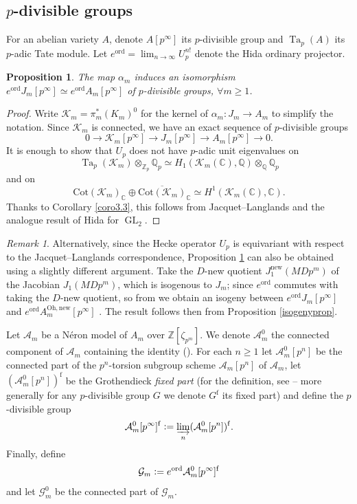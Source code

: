 \documentclass[a4paper,11pt]{amsart}
\numberwithin{equation}{section}
\theoremstyle{plain}
\newtheorem{proposition}[theorem]{Proposition}
\theoremstyle{definition}
\theoremstyle{remark}
\newtheorem{remark}[theorem]{Remark}
\newcommand{\Q}{\mathbb{Q}}
\newcommand{\Z}{\mathbb{Z}}
\newcommand{\C}{\mathbb{C}}
\newcommand{\defeq}{\vcentcolon=}
\DeclareMathOperator{\GL}{GL}
\DeclareMathOperator{\Ta}{Ta}
\newcommand{\ord}{\mathrm{ord}}
\newcommand{\new}{\mathrm{new}}
\newcommand{\Cot}{\mathrm{Cot}}
\newcommand{\Oh}{\mathrm{Oh}}
\newcommand{\dirlim}{\mathop{\varinjlim}\limits}
\begin{document}
\subsection{$p$-divisible groups}
For an abelian variety $A$, denote $A[p^\infty]$ its $p$-divisible group and $\Ta_p(A)$ its $p$-adic Tate module. {Let $e^\ord=\lim_{n\to\infty} U_p^{n!}$ denote the Hida ordinary projector.}

\begin{proposition}\label{isopdiv1}
The map $\alpha_m$ induces an isomorphism $e^\ord J_m[p^\infty]\simeq e^\ord A_m[p^\infty]$ of $p$-divisible groups, $\forall m\geq 1$.  
\end{proposition}

\begin{proof} Write $\mathcal{K}_m=\pi^*_m(K_m)^0$ for the kernel of $\alpha_m\colon J_m\rightarrow A_m$ to simplify the notation. Since $\mathcal{K}_m$ is connected, we have an exact sequence of $p$-divisible groups 
\[0\longrightarrow \mathcal{K}_m[p^\infty]\longrightarrow J_m[p^\infty]\longrightarrow A_m[p^\infty]\longrightarrow 0.\]
It is enough to show that $U_p$ does not have $p$-adic unit eigenvalues on \[\Ta_p(\mathcal{K}_m)\otimes_{\Z_p}\Q_p\simeq H_1(\mathcal{K}_m(\C),\Q)\otimes_\Q\Q_p\] and on \[\Cot(\mathcal{K}_m)_\C\oplus\overline{\Cot(\mathcal{K}_m)}_\C\simeq H^1(\mathcal{K}_m(\C),\C).\]
Thanks to Corollary \ref{coro3.3}, this follows from Jacquet--Langlands and the analogue result \cite[Proposition 4.1]{hida-measure} of Hida for $\GL_2$. 
\end{proof}

\begin{remark} Alternatively, since the Hecke operator $U_p$ is equivariant with respect to the Jacquet--Langlands correspondence, Proposition \ref{isopdiv1}
can also be obtained using a slightly different argument. Take the $D$-new quotient $J_1^\new(MDp^m)$ 
of the Jacobian $J_1(MDp^m)$, which is isogenous to $J_m$; since $e^\ord$ commutes with taking the $D$-new quotient, so from \cite[Proposition (1.2.1)]{OhtaMA} we obtain an isogeny between $e^\ord J_m[p^\infty]$ and $e^\ord A^{\Oh,\new}_m[p^\infty]$ . The result follows then from 
Proposition \ref{isogenyprop}.
\end{remark}
 
Let $\mathcal{A}_m$ be a N\'eron model of $A_m$ over $\Z[\zeta_{p^m}]$. 
We denote $\mathcal{A}_m^0$ the connected component of $\mathcal{A}_m$ containing the identity (\cite[\S1b)]{Mazur-Rational}). 
For each $n\geq 1$ let $\mathcal{A}^0_m[p^n]$ be the connected part of the $p^n$-torsion subgroup scheme $\mathcal{A}_m[p^n]$ of $\mathcal{A}_m$, let $(\mathcal{A}_m^0[p^n])^\mathrm{f}$ be the Grothendieck \emph{fixed part} (for the definition, see \cite[IX (2.2.2)]{Groth} -- more generally for any $p$-divisible group $G$ we denote $G^\mathrm{f}$ its fixed part) and define the $p$-divisible group 
\[\mathcal{A}^0_m[p^\infty]^\mathrm{f}\defeq\dirlim_n(\mathcal{A}_m^0[p^n])^\mathrm{f}.\]
Finally, define 
\[\mathcal{G}_m\defeq e^\ord\mathcal{A}^0_m[p^\infty]^\mathrm{f}\]
and let $\mathcal{G}_m^0$ be the connected part of $\mathcal{G}_m$.
\end{document}
